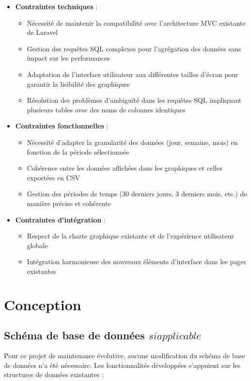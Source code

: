 \documentclass[a4paper,12pt]{report}
\begin{document}
  \begin{itemize}
    \item \textbf{Contraintes techniques} : 
    \begin{itemize}
      \item Nécessité de maintenir la compatibilité avec l'architecture MVC existante de Laravel
      \item Gestion des requêtes SQL complexes pour l'agrégation des données sans impact sur les performances
      \item Adaptation de l'interface utilisateur aux différentes tailles d'écran pour garantir la lisibilité des graphiques
      \item Résolution des problèmes d'ambiguïté dans les requêtes SQL impliquant plusieurs tables avec des noms de colonnes identiques
    \end{itemize}
    
    \item \textbf{Contraintes fonctionnelles} : 
    \begin{itemize}
      \item Nécessité d'adapter la granularité des données (jour, semaine, mois) en fonction de la période sélectionnée
      \item Cohérence entre les données affichées dans les graphiques et celles exportées en CSV
      \item Gestion des périodes de temps (30 derniers jours, 3 derniers mois, etc.) de manière précise et cohérente
    \end{itemize}
    
    \item \textbf{Contraintes d'intégration} : 
    \begin{itemize}
      \item Respect de la charte graphique existante et de l'expérience utilisateur globale
      \item Intégration harmonieuse des nouveaux éléments d'interface dans les pages existantes
    \end{itemize}
  \end{itemize}

\section{Conception}
  \subsection{Schéma de base de données \(si applicable\)}
  Pour ce projet de maintenance évolutive, aucune modification du schéma de base de données n'a été nécessaire. Les fonctionnalités développées s'appuient sur les structures de données existantes :
  
\end{document}
